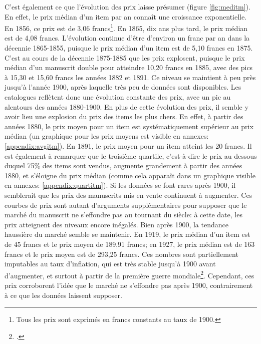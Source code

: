 C'est également ce que l'évolution des prix laisse présumer (figure \ref{fig:meditm}). En effet, le prix médian d'un item par an connaît une croissance exponentielle. En 1856, ce prix est de 3,06 francs\footnote{Tous les prix sont exprimés en francs constants au taux de 1900.}. En 1865, dix ans plus tard, le prix médian est de 4,08 francs. L'évolution continue d'être d'environ un franc par an dans la décennie 1865-1855, puisque le prix médian d'un item est de 5,10 francs en 1875. C'est au cours de la décennie 1875-1885 que les prix explosent, puisque le prix médian d'un manuscrit double pour atteindre 10,20 francs en 1885, avec des pics à 15,30 et 15,60 francs les années 1882 et 1891. Ce niveau se maintient à peu près jusqu'à l'année 1900, après laquelle très peu de données sont disponibles. Les catalogues reflètent donc une évolution constante des prix, avec un pic au alentours des années 1880-1900. En plus de cette évolution des prix, il semble y avoir lieu une explosion du prix des items les plus chers. En effet, à partir des années 1880, le prix moyen pour un item est systématiquement supérieur au prix médian (un graphique pour les prix moyens est visible en annexes: \ref{appendix:avgitm}). En 1891, le prix moyen pour un item atteint les 20 francs. Il est également à remarquer que le troisième quartile, c'est-à-dire le prix au dessous duquel 75\% des items sont vendus, augmente grandement à partir des années 1880, et s'éloigne du prix médian (comme cela apparaît dans un graphique visible en annexes: \ref{appendix:quartitm}). Si les données se font rares après 1900, il semblerait que les prix des manuscrits mis en vente continuent à augmenter. Ces courbes de prix sont autant d'arguments supplémentaires pour supposer que le marché du manuscrit ne s'effondre pas au tournant du siècle: à cette date, les prix atteignent des niveaux encore inégalés. Bien après 1900, la tendance haussière du marché semble se maintenir. En 1919, le prix médian d'un item est de 45 francs et le prix moyen de 189,91 francs; en 1927, le prix médian est de 163 francs et le prix moyen est de 293,25 francs. Ces nombres sont partiellement imputables au taux d'inflation, qui est très stable jusqu'à 1900 avant d'augmenter, et surtout à partir de la première guerre mondiale\footcite{piketty_les_2001}. Cependant, ces prix corroborent l'idée que le marché ne s'effondre pas après 1900, contrairement à ce que les données laissent supposer.

